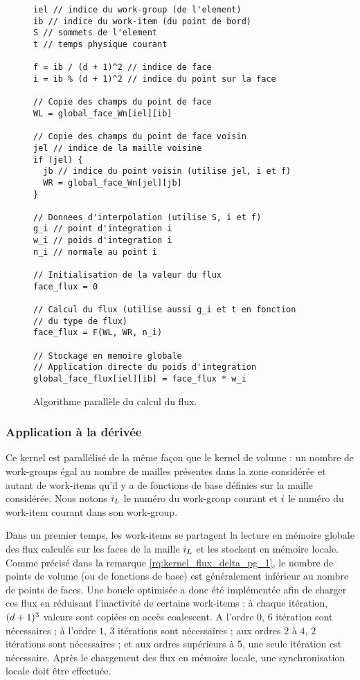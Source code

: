 \begin{figure}[!h]
	\begin{center}
		\caption{
			\label{img:kernel_surface_flux}
			Algorithme parallèle du calcul du flux.
		}
		
		\begin{lstlisting}
iel // indice du work-group (de l'element)
ib // indice du work-item (du point de bord)
S // sommets de l'element
t // temps physique courant

f = ib / (d + 1)^2 // indice de face
i = ib % (d + 1)^2 // indice du point sur la face

// Copie des champs du point de face
WL = global_face_Wn[iel][ib]

// Copie des champs du point de face voisin
jel // indice de la maille voisine
if (jel) {
  jb // indice du point voisin (utilise jel, i et f)
  WR = global_face_Wn[jel][jb]
}

// Donnees d'interpolation (utilise S, i et f)
g_i // point d'integration i
w_i // poids d'integration i
n_i // normale au point i

// Initialisation de la valeur du flux
face_flux = 0

// Calcul du flux (utilise aussi g_i et t en fonction
// du type de flux)
face_flux = F(WL, WR, n_i)

// Stockage en memoire globale
// Application directe du poids d'integration
global_face_flux[iel][ib] = face_flux * w_i
		\end{lstlisting}
	\end{center}
\end{figure}


  



\subsubsection{Application à la dérivée}
\label{sssect:kernel_surface_application}


Ce kernel est parallélisé de la même façon que le kernel de volume :
un nombre de work-groups égal au nombre de mailles
présentes dans la zone considérée et autant de work-items
qu'il y a de fonctions de base définies sur la maille considérée.
Nous notons $i_{L}$ le numéro du
work-group courant et $i$ le numéro du work-item courant dans son work-group.

Dans un premier temps, les work-items se partagent la lecture en mémoire
globale des flux calculés sur les faces de la maille
$i_{L}$ et les stockent en mémoire locale.
Comme précisé dans la remarque \ref{rq:kernel_flux_delta_pg_1},
le nombre de points de volume (ou de fonctions de base)
est généralement inférieur au nombre de points de faces.
Une boucle optimisée a donc été implémentée afin de charger ces
flux en réduisant l'inactivité de certains work-items :
à chaque itération, $(d + 1)^3$ valeurs sont copiées en accès coalescent.
A l'ordre $0$, $6$ itération sont nécessaires ;
à l'ordre $1$, $3$ itérations sont nécessaires ;
aux ordres $2$ à $4$, $2$ itérations sont nécessaires ;
et aux ordres supérieurs à $5$, une seule itération est nécessaire.
Après le chargement des flux en mémoire locale, une synchronisation
locale doit être effectuée.

